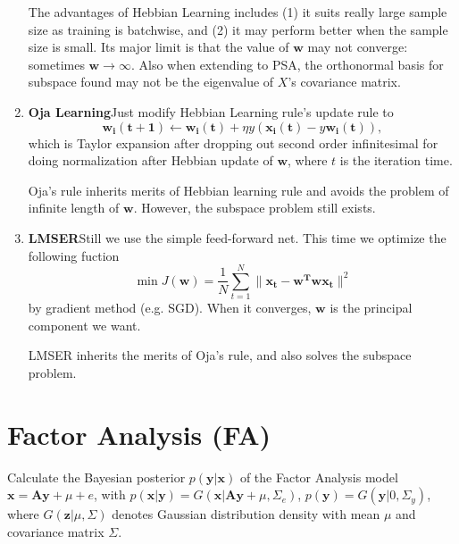 \documentclass[12pt,a4paper,UTF8,fntef]{article}
\begin{document}
\begin{enumerate}
	The advantages of Hebbian Learning includes (1) it suits really large sample size as training is batchwise, and (2) it may perform better when the sample size is small.  Its major limit is that the value of $\mathbf{w}$ may not converge: sometimes $\mathbf{w}\rightarrow\infty $.   Also when extending to PSA, the orthonormal basis for subspace found may not be the eigenvalue of $X$'s covariance matrix.
	\item \textbf{Oja Learning}\quad Just modify Hebbian Learning rule's update rule to
	$$
	\mathbf{w_i(t+1)}\leftarrow\mathbf{w_i(t)}+\eta y(\mathbf{x_i(t)}-y\mathbf{w_i(t)}),
	$$
	which is Taylor expansion after dropping out second order infinitesimal for doing normalization after Hebbian update of $\mathbf{w}$, where $t$ is the iteration time.

	Oja's rule inherits merits of Hebbian learning rule and avoids the problem of infinite length of $\mathbf{w}$. However, the subspace problem still exists.
	\item \textbf{LMSER}\quad Still we use the simple feed-forward net. This time we optimize the following fuction
	$$
	\min J(\mathbf{w})=\frac{1}{N}\sum_{t=1}^N\|\mathbf{x_t}-\mathbf{w^Twx_t}\|^2
	$$
	by gradient method (e.g. SGD). When it converges, $\mathbf{w}$ is the principal component we want.
	
	LMSER inherits the merits of Oja's rule, and also solves the subspace problem.
\end{enumerate}
\section{Factor Analysis (FA)}
Calculate the Bayesian posterior $p(\mathbf{y}|\mathbf{x})$ of the Factor Analysis model $\mathbf{x}=\mathbf{Ay}+\mu+e$, with $p(\mathbf{x}|\mathbf{y})=G(\mathbf{x}|\mathbf{Ay}+\mu,\Sigma_e)$, $p(\mathbf{y})=G(\mathbf{y}|0,\Sigma_y)$, where $G(\mathbf{z}|\mu,\Sigma)$ denotes Gaussian distribution density with mean $\mu$ and covariance matrix $\Sigma$.
\end{document}
